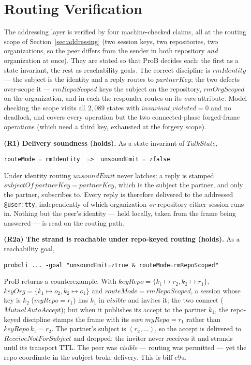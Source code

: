 \documentclass[a4paper,10pt,fleqn]{article}
\begin{document}
\section{Routing Verification}
\label{sec:routing}

The addressing layer is verified by four machine-checked claims, all at
the routing scope of Section~\ref{sec:addressing} (two session keys, two
repositories, two organizations, so the peer differs from the sender in
both repository \emph{and} organization at once).  They are stated so
that ProB decides each: the first as a state invariant, the rest as
reachability goals.  The correct discipline is $rmIdentity$ --- the
subject is the identity and a reply routes to $partnerKey$; the two
defects over-scope it --- $rmRepoScoped$ keys the subject on the
repository, $rmOrgScoped$ on the organization, and in each the responder
routes on its \emph{own} attribute.  Model checking the scope visits all
$2{,}089$ states with $invariant\_violated = 0$ and no deadlock, and
covers every operation but the two connected-phase forged-frame
operations (which need a third key, exhausted at the forgery scope).

\medskip\noindent\textbf{(R1) Delivery soundness (holds).}  As a state
invariant of $TalkState$,

\begin{verbatim}
routeMode = rmIdentity  =>  unsoundEmit = zfalse
\end{verbatim}

Under identity routing $unsoundEmit$ never latches: a reply is stamped
$subjectOf~partnerKey = partnerKey$, which is the subject the partner,
and only the partner, subscribes to.  Every reply is therefore delivered
to the addressed \texttt{@user:tty}, independently of which organization
\emph{or} repository either session runs in.  Nothing but the peer's
identity --- held locally, taken from the frame being answered --- is
read on the routing path.

\medskip\noindent\textbf{(R2a) The strand is reachable under
repo-keyed routing (holds).}  As a reachability goal,

\begin{verbatim}
probcli ... -goal "unsoundEmit=ztrue & routeMode=rmRepoScoped"
\end{verbatim}

ProB returns a counterexample.  With $keyRepo = \{k_1 \mapsto r_2,
k_2 \mapsto r_1\}$, $keyOrg = \{k_1 \mapsto o_2, k_2 \mapsto o_1\}$ and
$routeMode = rmRepoScoped$, a session whose key is $k_2$ ($myRepo = r_1$)
has $k_1$ in $visible$ and invites it; the two connect
($MutualAutoAccept$); but when it publishes its accept to the partner
$k_1$, the repo-keyed discipline stamps the frame with its \emph{own}
$myRepo = r_1$ rather than $keyRepo~k_1 = r_2$.  The partner's subject
is $(r_2, \ldots)$, so the accept is delivered to $ReceiveNotForSubject$
and dropped: the inviter never receives it and strands until its
transport TTL.  The peer was \emph{visible} --- routing was permitted ---
yet the repo coordinate in the subject broke delivery.  This is
biff-e9u.
\end{document}
